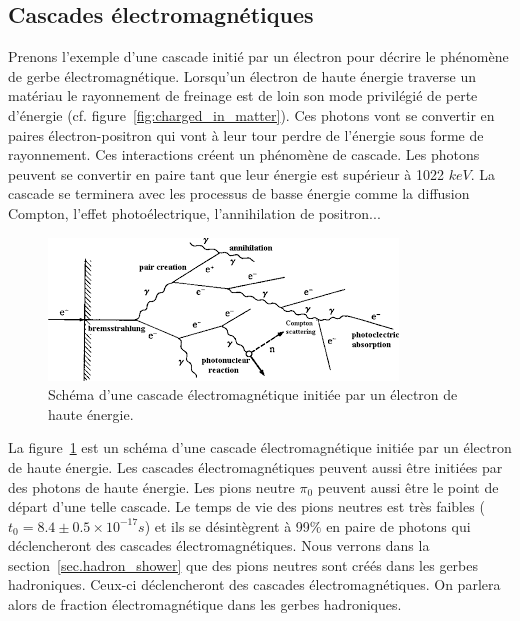 \subsection{Cascades électromagnétiques}
Prenons l'exemple d'une cascade initié par un électron pour décrire le phénomène de gerbe électromagnétique. Lorsqu'un électron de haute énergie traverse un matériau le rayonnement de freinage est de loin son mode privilégié de perte d'énergie (cf. figure~\ref{fig:charged_in_matter}). Ces photons vont se convertir en paires électron-positron qui vont à leur tour perdre de l'énergie sous forme de rayonnement. Ces interactions créent un phénomène de cascade. Les photons peuvent se convertir en paire tant que leur énergie est supérieur à 1022 $keV$. La cascade se terminera avec les processus de basse énergie comme la diffusion Compton, l'effet photoélectrique, l'annihilation de positron...
\begin{figure}[!h]
  \begin{center}
    \includegraphics[width=.4\textwidth]{ShowerTh/figs/electromagnetic_cascade.png}
    \caption{Schéma d'une cascade électromagnétique initiée par un électron de haute énergie.}
    \label{fig:electromagnetic_cascade}
  \end{center}
\end{figure}
La figure~\ref{fig:electromagnetic_cascade} est un schéma d'une cascade électromagnétique initiée par un électron de haute énergie. Les cascades électromagnétiques peuvent aussi être initiées par des photons de haute énergie. Les pions neutre $\pi_0$ peuvent aussi être le point de départ d'une telle cascade. Le temps de vie des pions neutres est très faibles ($t_0=8.4\pm 0.5\times 10^{-17}s$) et ils se désintègrent à 99$\%$ en paire de photons qui déclencheront des cascades électromagnétiques. Nous verrons dans la section~\ref{sec.hadron_shower} que des pions neutres sont créés dans les gerbes hadroniques. Ceux-ci déclencheront des cascades électromagnétiques. On parlera alors de fraction électromagnétique dans les gerbes hadroniques.

